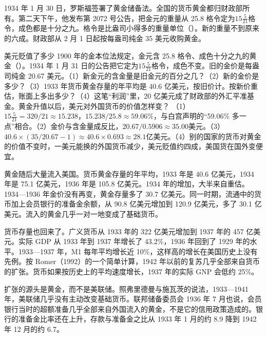 1934 年 1 月 30 日，罗斯福签署了黄金储备法\cite{app1934,gra1934}。全国的货币黄金都归财政部所有\cite{frhgra}。第二天下午，他发布第 2072 号公告，把金元的重量从 25.8 格令定为$15\frac{5}{21}$格令，成色都是十分之九\cite{app1934}。格令是比盎司小得多的重量单位（）。新的重量不到原来的六成\cite{app1934}。财政部从 2 月 1 日起按每盎司纯金 35 美元收购黄金\cite{app1934}。

\begin{example}{美元贬值了多少}\label{ex:depressionus-gold}
1900 年的金本位法规定，金元含 25.8 格令、成色十分之九的黄金（）。1934 年 1 月 31 日的公告把它定为$15\frac{5}{21}$格令，成色不变\cite{app1934}。旧的金价是每盎司纯金 20.67 美元。（1）新金元的含金量是旧金元的百分之几？（2）新的金价是多少？（3）1933 年货币黄金存量的年平均是 40.6 亿美元，按旧价计。按新价重估，账面上多出多少？（4）这笔“利润”里，20 亿美元成了财政部的外汇平准基金\cite{app1934}。黄金升值以后，美元对外国货币的价值怎样变？
\solution （1）$15\frac{5}{21}=320/21\approx15.238$，$15.238/25.8\approx59.06\%$，与白宫声明的“59.06\% 多一点”相合。（2）金价与含金量成反比，$20.67/0.5906\approx35.00$美元。（3）$40.6\times(35/20.67-1)\approx40.6\times0.693\approx28.1$亿美元。（4）别的国家的货币对黄金的价值不变时，一美元能换的外国货币减少，美元贬值约四成，美国货在国外变便宜。
\end{example}

黄金随后大量流入美国。货币黄金存量的年平均，1933 年是 40.6 亿美元，1934 年是 75.1 亿美元，1936 年是 105.8 亿美元\cite{frb1937a}。1934 年的增加，大半来自重估。1934—1936 年金价没有再变，黄金存量多了 30.7 亿美元\cite{frb1937a}。同一时期，流通中的货币加上会员银行的准备金余额，从 90.8 亿美元增加到 120.9 亿美元，多了 30.1 亿美元\cite{frb1937a}。流入的黄金几乎一对一地变成了基础货币。

货币存量也回来了。广义货币从 1933 年的 322 亿美元增加到 1937 年的 457 亿美元\cite{census1975x}。实际 GDP 从 1933 年到 1937 年增长了 43.2\%，1936 年回到了 1929 年的水平\cite{bea2026}。1933—1937 年，M1 每年平均增长近 10\%，这样高的增长在美国历史上没有先例\cite{romer1992}。按 Romer（1992）的一个简单计算，1942 年以前的复苏几乎全部来自货币的扩张\cite{romer1992}。货币如果按历史上的平均速度增长，1937 年的实际 GNP 会低约 25\%\cite{romer1992}。

扩张的源头是黄金，而不是美联储。照弗里德曼与施瓦茨的说法，1933—1941 年，美联储几乎没有主动改变基础货币\cite{romer1992}。联邦储备委员会 1936 年 7 月也说，会员银行当时的超额准备几乎全部来自外国流入的黄金，不是它的信用政策造成的\cite{frb1937a}。银行的准备金比率还在上升，存款与准备金之比从 1933 年 1 月的约 8.9 降到 1942 年 12 月的约 6.7\cite{romer1992}。

